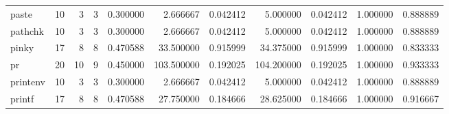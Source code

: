 \begin{longtable}{lrrrrrrrrrr}
paste     &                                      10 &                  3 &                                 3 &                                   0.300000 &                               2.666667 &                                     0.042412 &                          5.000000 &                                0.042412 &                           1.000000 &                                           0.888889 \\
pathchk   &                                      10 &                  3 &                                 3 &                                   0.300000 &                               2.666667 &                                     0.042412 &                          5.000000 &                                0.042412 &                           1.000000 &                                           0.888889 \\
pinky     &                                      17 &                  8 &                                 8 &                                   0.470588 &                              33.500000 &                                     0.915999 &                         34.375000 &                                0.915999 &                           1.000000 &                                           0.833333 \\
pr        &                                      20 &                 10 &                                 9 &                                   0.450000 &                             103.500000 &                                     0.192025 &                        104.200000 &                                0.192025 &                           1.000000 &                                           0.933333 \\
printenv  &                                      10 &                  3 &                                 3 &                                   0.300000 &                               2.666667 &                                     0.042412 &                          5.000000 &                                0.042412 &                           1.000000 &                                           0.888889 \\
printf    &                                      17 &                  8 &                                 8 &                                   0.470588 &                              27.750000 &                                     0.184666 &                         28.625000 &                                0.184666 &                           1.000000 &                                           0.916667 \\

\end{longtable}
